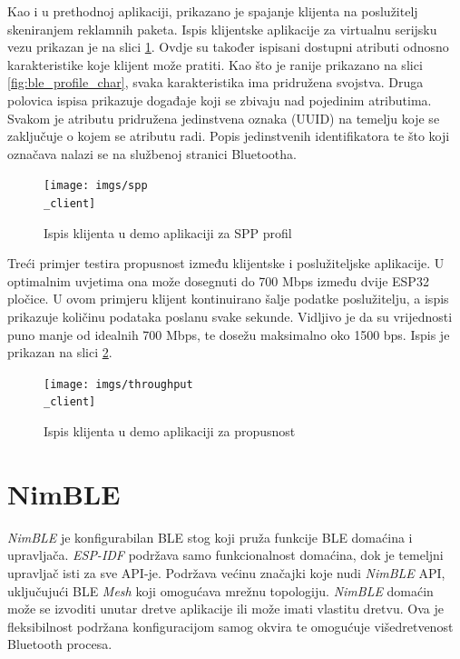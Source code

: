 Kao i u prethodnoj aplikaciji, prikazano je spajanje klijenta na poslužitelj skeniranjem reklamnih paketa. Ispis klijentske aplikacije za virtualnu serijsku vezu prikazan je na slici \ref{fig:spp_client}. Ovdje su također ispisani dostupni atributi odnosno karakteristike koje klijent može pratiti. Kao što je ranije prikazano na slici \ref{fig:ble_profile_char}, svaka karakteristika ima pridružena svojstva. Druga polovica ispisa prikazuje događaje koji se zbivaju nad pojedinim atributima. Svakom je atributu pridružena jedinstvena oznaka (UUID) na temelju koje se zaključuje o kojem se atributu radi. Popis jedinstvenih identifikatora te što koji označava nalazi se na službenoj stranici Bluetootha. \cite{bluetooth_ofisl} 

\begin{figure}[ht]
	\centering
	\texttt{[image: imgs/spp\\\_client]}
	\caption{Ispis klijenta u demo aplikaciji za SPP profil}
	\label{fig:spp_client}
\end{figure}

Treći primjer testira propusnost između klijentske i poslužiteljske aplikacije. U optimalnim uvjetima ona može dosegnuti do 700 Mbps između dvije ESP32 pločice. U ovom primjeru klijent kontinuirano šalje podatke poslužitelju, a ispis prikazuje količinu podataka poslanu svake sekunde. Vidljivo je da su vrijednosti puno manje od idealnih 700 Mbps, te dosežu maksimalno oko 1500 bps. Ispis je prikazan na slici \ref{fig:throughput_client}.

\begin{figure}[ht]
	\centering
	\texttt{[image: imgs/throughput\\\_client]}
	\caption{Ispis klijenta u demo aplikaciji za propusnost}
	\label{fig:throughput_client}
\end{figure}

\section{NimBLE}

\textit{NimBLE} je konfigurabilan BLE stog koji pruža funkcije BLE domaćina i upravljača. \textit{ESP-IDF} podržava samo funkcionalnost domaćina, dok je temeljni upravljač isti za sve API-je. Podržava većinu značajki koje nudi \textit{NimBLE} API, uključujući BLE \textit{Mesh} koji omogućava mrežnu topologiju. \textit{NimBLE} domaćin može se izvoditi unutar dretve aplikacije ili može imati vlastitu dretvu. Ova je fleksibilnost podržana konfiguracijom samog okvira te omogućuje višedretvenost Bluetooth procesa.

